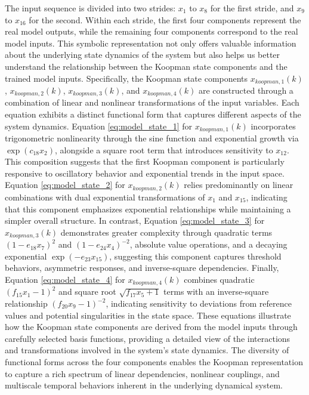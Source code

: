 The input sequence is divided into two strides: \(x_{1}\) to \(x_{8}\) for the first stride, and \(x_{9}\) to \(x_{16}\) for the second. Within each stride, the first four components represent the real model outputs, while the remaining four components correspond to the real model inputs. This symbolic representation not only offers valuable information about the underlying state dynamics of the system but also helps us better understand the relationship between the Koopman state components and the trained model inputs. Specifically, the Koopman state components \(x_{koopman,1}(k)\), \(x_{koopman,2}(k)\), \(x_{koopman,3}(k)\), and \(x_{koopman,4}(k)\) are constructed through a combination of linear and nonlinear transformations of the input variables.
Each equation exhibits a distinct functional form that captures different aspects of the system dynamics. Equation \ref{eq:model_state_1} for \(x_{koopman,1}(k)\) incorporates trigonometric nonlinearity through the sine function and exponential growth via \(\exp(c_{18} x_2)\), alongside a square root term that introduces sensitivity to \(x_{12}\). This composition suggests that the first Koopman component is particularly responsive to oscillatory behavior and exponential trends in the input space. Equation \ref{eq:model_state_2} for \(x_{koopman,2}(k)\) relies predominantly on linear combinations with dual exponential transformations of \(x_1\) and \(x_{15}\), indicating that this component emphasizes exponential relationships while maintaining a simpler overall structure. In contrast, Equation \ref{eq:model_state_3} for \(x_{koopman,3}(k)\) demonstrates greater complexity through quadratic terms \((1 - e_{18} x_7)^2\) and \((1 - e_{24} x_4)^{-2}\), absolute value operations, and a decaying exponential \(\exp(-e_{23} x_{15})\), suggesting this component captures threshold behaviors, asymmetric responses, and inverse-square dependencies. Finally, Equation \ref{eq:model_state_4} for \(x_{koopman,4}(k)\) combines quadratic \((f_{15} x_1 - 1)^2\) and square root \(\sqrt{f_{17} x_5 + 1}\) terms with an inverse-square relationship \((f_{20} x_9 - 1)^{-2}\), indicating sensitivity to deviations from reference values and potential singularities in the state space.
These equations illustrate how the Koopman state components are derived from the model inputs through carefully selected basis functions, providing a detailed view of the interactions and transformations involved in the system's state dynamics. The diversity of functional forms across the four components enables the Koopman representation to capture a rich spectrum of linear dependencies, nonlinear couplings, and multiscale temporal behaviors inherent in the underlying dynamical system.

